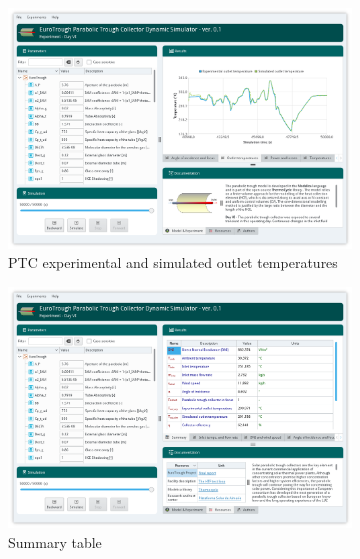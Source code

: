 \documentclass[final,3p,times,review]{elsarticle}
\begin{document}
\begin{figure}[h]
	\centering
	\begin{subfigure}[t]{0.48\textwidth}
		\centering
		\includegraphics[width=\textwidth]{Figures/EuroTrough-surf1.png}
		\caption{PTC experimental and simulated outlet temperatures}
		\label{fig:SimTool1}	
	\end{subfigure}
	\begin{subfigure}[t]{0.48\textwidth}
		\centering
		\includegraphics[width=\textwidth]{Figures/EuroTrough-surf2.png}
		\caption{Summary table}
		\label{fig:SimTool2}
	\end{subfigure}
	\begin{subfigure}[t]{0.48\textwidth}
		\centering

\end{subfigure}
\end{figure}
\end{document}
